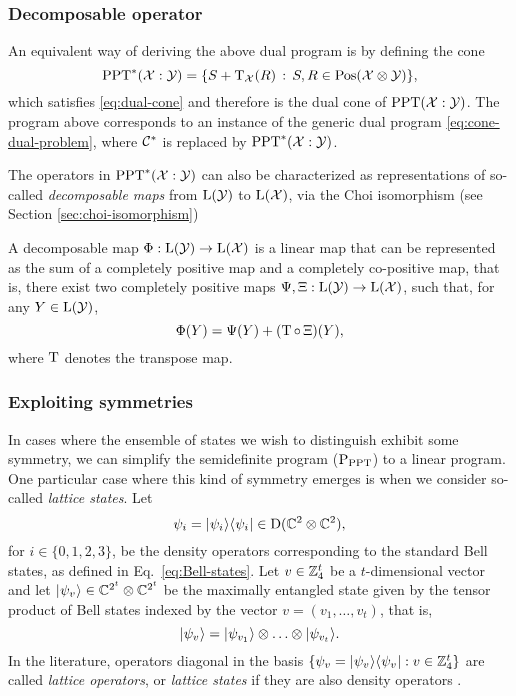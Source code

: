 \subsubsection{Decomposable operator}
An equivalent way of deriving the above dual program is by defining the cone 
\begin{equation}
  \mathrm{PPT}^{\ast}(\mathcal{X}:\mathcal{Y}) = \{ S + \operatorname{T}_{\mathcal{X}}(R) \,:\, S, R \in \mathrm{Pos}(\mathcal{X}\otimes\mathcal{Y}) \},
\end{equation}
which satisfies \eqref{eq:dual-cone} and therefore is the dual cone of 
$\mathrm{PPT}(\mathcal{X}:\mathcal{Y})$.
The program above corresponds to an instance of 
the generic dual program \eqref{eq:cone-dual-problem}, where $\mathcal{C}^{\ast}$ is 
replaced by $\mathrm{PPT}^{\ast}(\mathcal{X}:\mathcal{Y})$.

The operators in $\mathrm{PPT}^{\ast}(\mathcal{X}:\mathcal{Y})$ can also be characterized as 
representations of so-called \emph{decomposable maps} from 
$\mathrm{L}(\mathcal{Y})$ to $\mathrm{L}(\mathcal{X})$, via the Choi isomorphism 
(see Section \ref{sec:choi-isomorphism})
\begin{definition}
A decomposable map $\Phi:\mathrm{L}(\mathcal{Y})\rightarrow\mathrm{L}(\mathcal{X})$ is a linear map that can 
be represented as the sum of a completely positive map and a completely 
co-positive map, that is, there exist two completely positive maps 
$\Psi,\Xi:\mathrm{L}(\mathcal{Y})\rightarrow\mathrm{L}(\mathcal{X})$, such that, for any $Y\in\mathrm{L}(\mathcal{Y})$,
\begin{equation}
  \Phi(Y) = \Psi(Y) + (\operatorname{T} {\circ}\, \Xi)(Y),
\end{equation}
where $\operatorname{T}$ denotes the transpose map.
\end{definition}

\subsubsection{Exploiting symmetries}

In cases where the ensemble of states we wish to distinguish exhibit some symmetry,
we can simplify the semidefinite program ($\textup{P}_{\mathrm{PPT}}$) to a linear program.
One particular case where this kind of symmetry emerges is when 
we consider so-called \emph{lattice states}. Let
\[
  \psi_{i} = \lvert\mspace{0.5mu} \psi_{i} \mspace{0.5mu} \rangle\langle\mspace{0.5mu} \psi_{i} \mspace{0.5mu} \rvert \in \mathrm{D}(\mathbb{C}^{2}\otimes\mathbb{C}^{2}),
\]
for $i\in \{0,1,2,3\}$, be the density operators corresponding to the standard Bell 
states, as defined in Eq.~\eqref{eq:Bell-states}.
Let $v \in \mathbb{Z}_{4}^{t} $ be a $t$-dimensional vector and let 
$\lvert\mspace{0.5mu} \psi_{v} \mspace{0.5mu} \rangle \in \mathbb{C}^{2^{t}}\otimes\mathbb{C}^{2^{t}}$ 
be the maximally entangled state given by the tensor product of Bell states indexed by the vector 
$v = (v_{1}, \ldots, v_{t})$, that is,
$$
\lvert\mspace{0.5mu} \psi_{v} \mspace{0.5mu} \rangle = \lvert\mspace{0.5mu} \psi_{v_{1}} \mspace{0.5mu} \rangle\otimes\ldots\otimes\lvert\mspace{0.5mu} \psi_{v_{t}} \mspace{0.5mu} \rangle.
$$
In the literature, operators diagonal in the basis 
$\{\psi_{v} = \lvert\mspace{0.5mu} \psi_{v} \mspace{0.5mu} \rangle\langle\mspace{0.5mu} \psi_{v} \mspace{0.5mu} \rvert : v \in \mathbb{Z}_{4}^{t}\}$
are called \emph{lattice operators}, or \emph{lattice states} if they are also 
density operators \cite{Piani06}.

